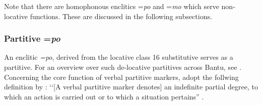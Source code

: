 Note that there are homophonous enclitics =\textit{po} and \mbox{=\textit{mo}} which serve non-locative functions. These are discussed in the following subsections.
\subsubsection{Partitive =\textit{po}}\label{PoPartitive}
An enclitic \textit{=po}, derived from the locative class 16 substitutive serves as a partitive. For an overview over such de-locative partitives across Bantu, see \citet{DevosMPersohnB2017}. Concerning the core function of verbal partitive markers, \citeauthor{DevosMPersohnB2017} adopt the follwing definition by \citeauthor{BuddP2014}: \lq\lq [A verbal partitive marker denotes] an indefinite partial degree, to which an action is carried out or to which a situation pertains” \citep[524]{BuddP2014}.

